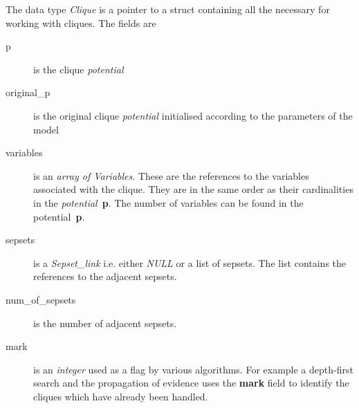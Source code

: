 \documentclass[12pt,a4paper]{report}
\newcommand{\cdatatype}[1]{{\it #1}}
\newcommand{\cstructfield}[1]{\textbf{#1}}
\begin{document}
The data type \cdatatype{Clique} is a pointer to a struct containing all the
necessary for working with cliques. The fields are
\begin{description}
\item[p] is the clique \cdatatype{potential}

\item[original\_p] is the original clique \cdatatype{potential} initialised
according to the parameters of the model

\item[variables] is an \cdatatype{array of Variables}. These are the
references to the variables associated with the clique. They are in
the same order as their cardinalities in the 
\cdatatype{potential}~\cstructfield{p}. The number of variables can be 
found in the potential~\cstructfield{p}.

\item[sepsets] is a \cdatatype{Sepset\_link} i.e. either
\cdatatype{NULL} or a list of sepsets. The list contains the
references to the adjacent sepsets.

\item[num\_of\_sepsets] is the number of adjacent sepsets.

\item[mark] is an \cdatatype{integer} used as a flag by various
algorithms. For example a depth-first search and the propagation of 
evidence uses the \cstructfield{mark} field to identify the cliques 
which have already been handled.
\end{description}
\end{document}
